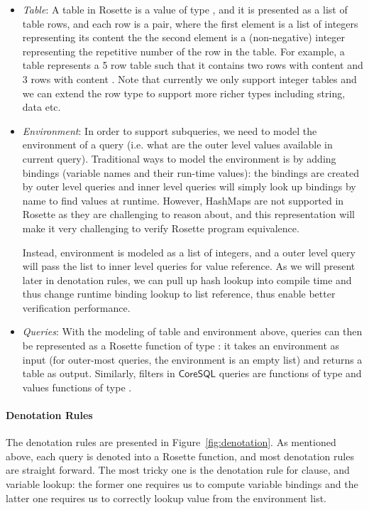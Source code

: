 \begin{itemize}\itemsep0pt
\item \emph{Table}: A table in Rosette is a value of type , and it is presented as a list of table rows, and each row is a pair, where the first element is a list of integers representing its content the the second element is a (non-negative) integer representing the repetitive number of the row in the table. For example, a table  represents a 5 row table such that it contains two rows with content  and 3 rows with content . Note that currently we only support integer tables and we can extend the row type to support more richer types including string, data etc.

\item \emph{Environment}: In order to support subqueries, we need to model the environment of a query (i.e. what are the outer level values available in current query). Traditional ways to model the environment is by adding bindings (variable names and their run-time values): the bindings are created by outer level queries and inner level queries will simply look up bindings by name to find values at runtime. However, HashMaps are not supported in Rosette as they are challenging to reason about, and this representation will make it very challenging to verify Rosette program equivalence. 

Instead, environment is modeled as a list of integers, and a outer level query will pass the list to inner level queries for value reference. As we will present later in denotation rules, we can pull up hash lookup into compile time and thus change runtime binding lookup to list reference, thus enable better verification performance.

\item \emph{Queries}: With the modeling of table and environment above, queries can then be represented as a Rosette function of type : it takes an environment as input (for outer-most queries, the environment is an empty list) and returns a table as output. Similarly, filters in $\mathsf{CoreSQL}$ queries are functions of type  and values functions of type  .
\end{itemize}

\paragraph{Denotation Rules} The denotation rules are presented in Figure~\ref{fig:denotation}. As mentioned above, each query is denoted into a Rosette function, and most denotation rules are straight forward. The most tricky one is the denotation rule for  clause, and variable lookup: the former one requires us to compute variable bindings and the latter one requires us to correctly lookup value from the environment list.


